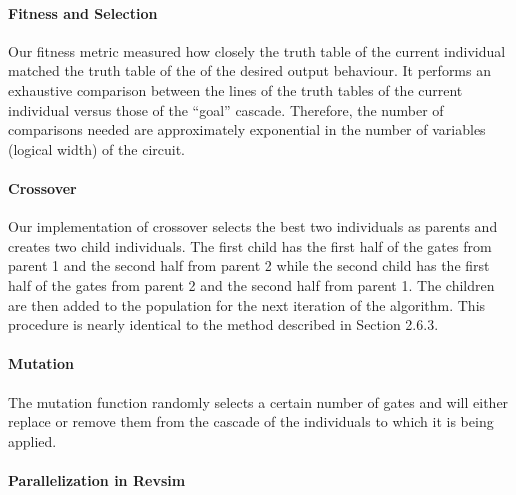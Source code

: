 \paragraph{Fitness and Selection} 

Our fitness metric measured how closely the truth table of the current individual matched the truth table of the of 
the desired output behaviour. It performs an exhaustive comparison between the lines of the truth tables of the current individual versus those of the ``goal'' cascade. Therefore, the number of comparisons needed are approximately
 exponential in the number of variables (logical width) of the circuit.  


\paragraph{Crossover}

Our implementation of crossover selects the best two individuals as parents and creates two child individuals. The first child has the 
first half of the gates from parent 1 and the second half from parent 2 while the second child has the first half of the gates from 
parent 2 and the second half from parent 1. The children are then added to the population for the next iteration of the algorithm. This procedure is nearly identical to the method described in Section 2.6.3.

\paragraph{Mutation}

The mutation function randomly selects a certain number of gates and will either replace or remove them from the cascade of the 
individuals to which it is being applied.



\paragraph{Parallelization in Revsim} 

